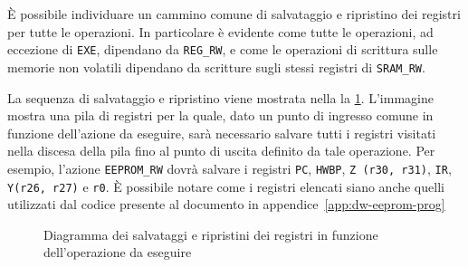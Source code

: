 È possibile individuare un cammino comune di salvataggio e ripristino dei registri per tutte le operazioni. In particolare è evidente come tutte le operazioni, ad eccezione di \texttt{EXE}, dipendano da \texttt{REG\_RW}, e come le operazioni di scrittura sulle memorie non volatili dipendano da scritture sugli stessi registri di \texttt{SRAM\_RW}.

La sequenza di salvataggio e ripristino viene mostrata nella la \cref{fig:dw-wrt-seq}. L'immagine mostra una pila di registri per la quale, dato un punto di ingresso comune in funzione dell'azione da eseguire, sarà necessario salvare tutti i registri visitati nella discesa della pila fino al punto di uscita definito da tale operazione. Per esempio, l'azione \texttt{EEPROM\_RW} dovrà salvare i registri \texttt{PC}, \texttt{HWBP}, \texttt{Z (r30, r31)}, \texttt{IR}, \texttt{Y(r26, r27)} e \texttt{r0}. È possibile notare come i registri elencati siano anche quelli utilizzati dal codice presente al documento in appendice~\ref{app:dw-eeprom-prog}

\begin{figure}[ht]
    \centering

    \caption[]{Diagramma dei salvataggi e ripristini dei registri in funzione dell'operazione da eseguire}\label{fig:dw-wrt-seq}
\end{figure}

